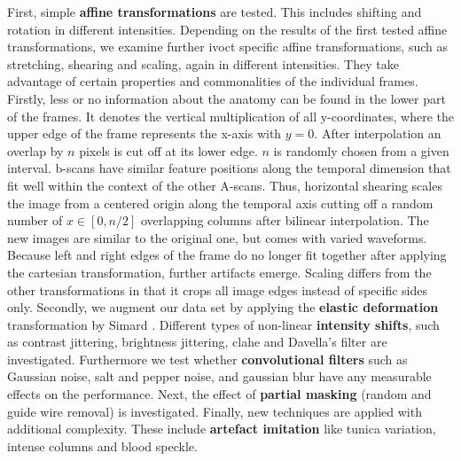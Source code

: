 First, simple \textbf{affine transformations} are tested. This includes shifting and rotation in different intensities. Depending on the results of the first tested affine transformations, we examine further \acrshort{ivoct} specific affine transformations, such as stretching, shearing and scaling, again in different intensities. They take advantage of certain properties and commonalities of the individual frames. Firstly, less or no information about the anatomy can be found in the lower part of the frames. It denotes the vertical multiplication of all y-coordinates, where the upper edge of the frame represents the x-axis with \( y = 0 \). After interpolation an overlap by \( n \) pixels is cut off at its lower edge. \( n \) is randomly chosen from a given interval. \Glspl{b-scan} have similar feature positions along the temporal dimension that fit well within the context of the other A-scans. Thus, horizontal shearing scales the image from a centered origin along the temporal axis cutting off a random number of \( x \in [0, n/2] \) overlapping columns after bilinear interpolation. The new images are similar to the original one, but comes with varied waveforms. Because left and right edges of the frame do no longer fit together after applying the cartesian transformation, further artifacts emerge. Scaling differs from the other transformations in that it crops all image edges instead of specific sides only. Secondly, we augment our data set by applying the \textbf{elastic deformation} transformation by Simard \cite{Simard.2003}. Different types of non-linear \textbf{intensity shifts}, such as contrast jittering, brightness jittering, \acrshort{clahe} and Davella's filter \cite{Devalla.2018} are investigated. Furthermore we test whether \textbf{convolutional filters} such as Gaussian noise, salt and pepper noise, and gaussian blur have any measurable effects on the performance. Next, the effect of  \textbf{partial masking} (random and guide wire removal) is investigated. Finally, new techniques are applied with additional complexity. These include \textbf{artefact imitation} like tunica variation, intense columns and blood speckle.


